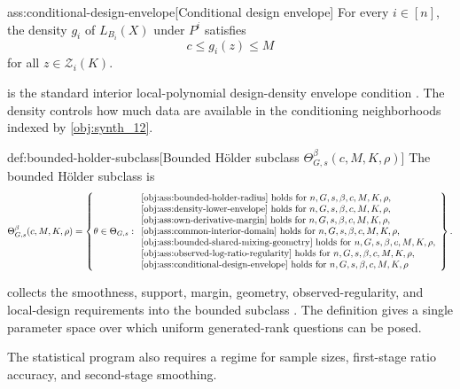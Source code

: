 \documentclass[11pt]{article}
\begin{document}
\begin{assumptionv}{ass:conditional-design-envelope}[Conditional design envelope]
For every \(i\in[n]\), the density \(g_i\) of \(L_{B_i}(X)\) under \(P^i\) satisfies
\[
c\le g_i(z)\le M
\]
for all \(z\in\mathcal Z_i(K)\).
\end{assumptionv}

 is the standard interior local-polynomial design-density envelope condition \citep{Xie2023UniformConditionalCDF}. The density  controls how much data are available in the conditioning neighborhoods indexed by \cref{obj:synth_12}.

\begin{definitionv}{def:bounded-holder-subclass}[Bounded Hölder subclass $\Theta^{\beta}_{G,s}(c,M,K,\rho)$]
The bounded Hölder subclass is
\[
\Theta^{\beta}_{G,s}(c,M,K,\rho)
=
\left\{
\theta\in\Theta_{G,s}:
\begin{array}{l}
\text{\cref{obj:ass:bounded-holder-radius} holds for } n,G,s,\beta,c,M,K,\rho,\\
\text{\cref{obj:ass:density-lower-envelope} holds for } n,G,s,\beta,c,M,K,\rho,\\
\text{\cref{obj:ass:own-derivative-margin} holds for } n,G,s,\beta,c,M,K,\rho,\\
\text{\cref{obj:ass:common-interior-domain} holds for } n,G,s,\beta,c,M,K,\rho,\\
\text{\cref{obj:ass:bounded-shared-mixing-geometry} holds for } n,G,s,\beta,c,M,K,\rho,\\
\text{\cref{obj:ass:observed-log-ratio-regularity} holds for } n,G,s,\beta,c,M,K,\rho,\\
\text{\cref{obj:ass:conditional-design-envelope} holds for } n,G,s,\beta,c,M,K,\rho
\end{array}
\right\}.
\]
\end{definitionv}

 collects the smoothness, support, margin, geometry, observed-regularity, and local-design requirements into the bounded subclass . The definition gives a single parameter space over which uniform generated-rank questions can be posed.

The statistical program also requires a regime for sample sizes, first-stage ratio accuracy, and second-stage smoothing.
\end{document}

